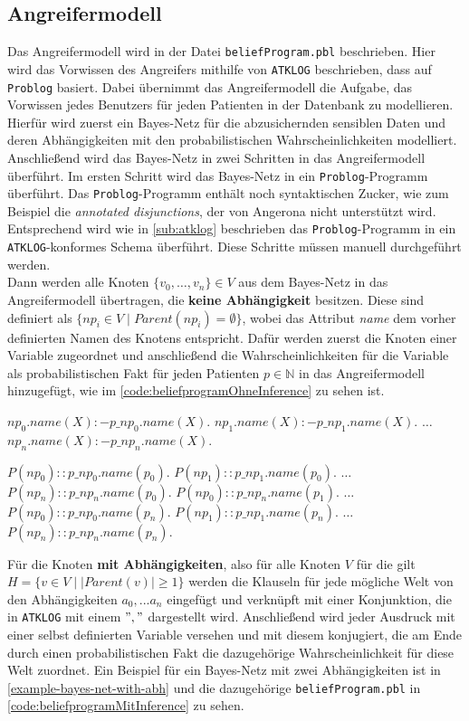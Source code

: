\documentclass[german,version-2020-11]{uzl-thesis}
\begin{document}
\subsection{Angreifermodell} \label{2.2.1}
Das Angreifermodell wird in der Datei \texttt{beliefProgram.pbl} beschrieben. Hier wird das Vorwissen des Angreifers mithilfe von \texttt{ATKLOG} beschrieben, dass auf \texttt{Problog} basiert. Dabei übernimmt das Angreifermodell die Aufgabe, das Vorwissen jedes Benutzers für jeden Patienten in der Datenbank zu modellieren. \\ 
Hierfür wird zuerst ein Bayes-Netz für die abzusichernden sensiblen Daten und deren Abhängigkeiten mit den probabilistischen Wahrscheinlichkeiten modelliert. Anschließend wird das Bayes-Netz in zwei Schritten in das Angreifermodell überführt. Im ersten Schritt wird das Bayes-Netz in ein \texttt{Problog}-Programm überführt. Das \texttt{Problog}-Programm enthält noch syntaktischen Zucker, wie zum Beispiel die \emph{annotated disjunctions}, der von Angerona nicht unterstützt wird. Entsprechend wird wie in \cref{sub:atklog} beschrieben das \texttt{Problog}-Programm  in ein \texttt{ATKLOG}-konformes Schema überführt. Diese Schritte müssen manuell durchgeführt werden. \\   
Dann werden alle Knoten $\{v_0, \dots ,v_n\} \in V$ aus dem Bayes-Netz in das Angreifermodell übertragen, die \textbf{keine Abhängigkeit} besitzen. Diese sind definiert als $\{np_i \in V \mid Parent(np_i) = \emptyset\}$, wobei das Attribut \textit{name} dem vorher definierten Namen des Knotens entspricht. Dafür werden zuerst die Knoten einer Variable zugeordnet und anschließend die Wahrscheinlichkeiten für die Variable als probabilistischen Fakt für jeden Patienten $p \in \mathbb{N}$ in das Angreifermodell hinzugefügt, wie im \autoref{code:beliefprogramOhneInference} zu sehen ist. 
\newpage
\begin{Pseudocode} [caption={\texttt{beliefProgram.pbl} für Knoten ohne Abhängigkeiten}, label={code:beliefprogramOhneInference}, numbers=left]
$np_0.name(X) :- p\_np_0.name(X).$ 
$np_1.name(X) :- p\_np_1.name(X).$ 
$\dots$
$np_n.name(X) :- p\_np_n.name(X).$

$P(np_0) ::  p\_np_0.name(p_0).$ 
$P(np_1) ::  p\_np_1.name(p_0).$ 
$\dots$
$P(np_n) ::  p\_np_n.name(p_0).$ 
$P(np_0) ::  p\_np_n.name(p_1).$ 
$\dots$
$P(np_0) ::  p\_np_0.name(p_n).$ 
$P(np_1) ::  p\_np_1.name(p_n).$ 
$\dots$
$P(np_n) ::  p\_np_n.name(p_n).$ 
\end{Pseudocode}
Für die Knoten \textbf{mit Abhängigkeiten}, also für alle Knoten $V$ für die gilt $H=\{v \in V \mid \lvert Parent(v) \rvert \geq 1 \}$ werden die Klauseln für jede mögliche Welt von den Abhängigkeiten $a_0, ... a_n$ eingefügt und verknüpft mit einer Konjunktion, die in \texttt{ATKLOG} mit einem $","$ dargestellt wird. Anschließend wird jeder Ausdruck mit einer selbst definierten Variable versehen und mit diesem konjugiert, die am Ende durch einen probabilistischen Fakt die dazugehörige Wahrscheinlichkeit für diese Welt zuordnet. Ein Beispiel für ein Bayes-Netz mit zwei Abhängigkeiten ist in \autoref{example-bayes-net-with-abh}  und die dazugehörige \texttt{beliefProgram.pbl} in \autoref{code:beliefprogramMitInference} zu sehen.
\end{document}
